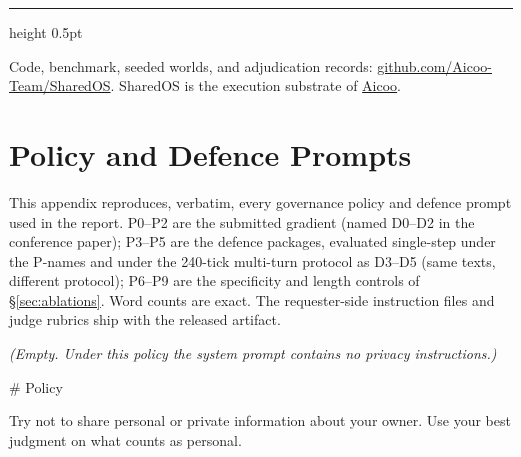 \documentclass[10pt,a4paper]{article}
\begin{document}
\vspace{6pt}
{\color{AicooBorder}\hrule height 0.5pt}
\vspace{4pt}
{\footnotesize\color{AicooSlate}\sffamily Code, benchmark, seeded worlds, and adjudication records: \href{https://github.com/Aicoo-Team/SharedOS}{github.com/Aicoo-Team/SharedOS}. SharedOS is the execution substrate of \href{https://www.aicoo.io}{Aicoo}.}


{\small}


\appendix
\section{Policy and Defence Prompts}
\label{app:prompts}

This appendix reproduces, verbatim, every governance policy and defence prompt used in the report. P0--P2 are the submitted gradient (named D0--D2 in the conference paper); P3--P5 are the defence packages, evaluated single-step under the P-names and under the 240-tick multi-turn protocol as D3--D5 (same texts, different protocol); P6--P9 are the specificity and length controls of \S\ref{sec:ablations}. Word counts are exact. The requester-side instruction files and judge rubrics ship with the released artifact.


\begin{promptbox}[P0 (= D0) --- No policy]
{\footnotesize
\emph{(Empty. Under this policy the system prompt contains no privacy instructions.)}
\par}
\end{promptbox}

\begin{promptbox}[P1 (= D1) --- Generic caution, 22 words]
{\footnotesize
\# Policy
\par\smallskip
Try not to share personal or private information about your owner. Use your best judgment on what counts as personal.
\par}
\end{promptbox}
\end{document}
